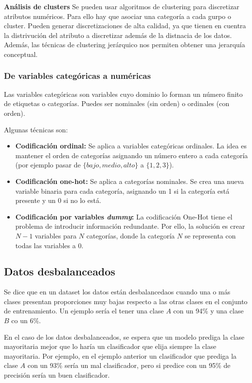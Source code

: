 \documentclass[12pt, letterpaper]{article}
\begin{document}
\vspace{1 em}
\textbf{Análisis de clusters}
Se pueden usar algoritmos de clustering para discretizar atributos numéricos. Para ello hay que asociar una categoría a cada gurpo o cluster. Pueden generar discretizaciones de alta calidad, ya que tienen en cuentra la distrivución del atributo a discretizar además de la distnacia de los datos. Además, las técnicas de clustering jerárquico nos permiten obtener una jerarquía conceptual.

\subsubsection{De variables categóricas a numéricas}
Las variables categóricas son variables cuyo dominio lo forman un número finito de etiquetas o categorías. Puedes ser nominales (sin orden) o ordinales (con orden).

Algunas técnicas son:
\begin{itemize}
    \item \textbf{Codificación ordinal:} Se aplica a variables categóricas ordinales. La idea es mantener el orden de categorías asignando un número entero a cada categoría (por ejemplo pasar de $\{bajo, medio, alto\}$ a $\{1,2,3\}$).
    \item \textbf{Codificación one-hot:} Se aplica a categorías nominales. Se crea una nueva variable binaria para cada categoría, asignando un 1 si la categoría está presente y un 0 si no lo está.
    \item \textbf{Codificación por variables \textit{dummy}:} La codificación One-Hot tiene el problema de introducir información redundante. Por ello, la solución es crear $N-1$ variables para $N$ categorías, donde la categoría $N$ se representa con todas las variables a 0.
\end{itemize}


\subsection{Datos desbalanceados}

Se dice que en un dataset los datos están desbalancedaos cuando una o más clases presentan proporciones muy bajas respecto a las otras clases en el conjunto de entrenamiento. Un ejemplo sería el tener una clase $A$ con un 94\% y una clase $B$ co un 6\%.

En el caso de los datos desbalanceados, se espera que un modelo prediga la clase mayoritaria mejor que lo haría un clasificador que elija siempre la clase mayoritaria. Por ejemplo, en el ejemplo anterior un clasificador que prediga la clase $A$ con un 93\% sería un mal clasificador, pero si predice con un 95\% de precisión sería un buen clasificador.
\end{document}
